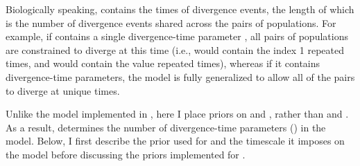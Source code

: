 Biologically speaking, \divTimeVector contains the times of divergence events,
the length of which \divTimeNum is the number of divergence events shared across
the \npairs{} pairs of populations.
For example, if \divTimeVector contains a single divergence-time parameter
, all \npairs{} pairs of populations are constrained to diverge at
this time (i.e., \divTimeIndexVector would contain the index 1 repeated
\npairs{} times, and \divTimeMapVector would contain the value 
repeated \npairs{} times), whereas if it contains \npairs{} divergence-time
parameters, the model is fully generalized to allow all of the pairs to diverge
at unique times.

Unlike the model implemented in \msb, here I place priors on
\divTimeIndexVector and \divTime{}, rather than \divTimeNum and
\divTime{}.
As a result, \divTimeIndexVector determines the number of divergence-time
parameters (\divTimeNum) in the model.
Below, I first describe the prior used for \divTime{} and the timescale it
imposes on the model before discussing the priors implemented for
\divTimeIndexVector.

